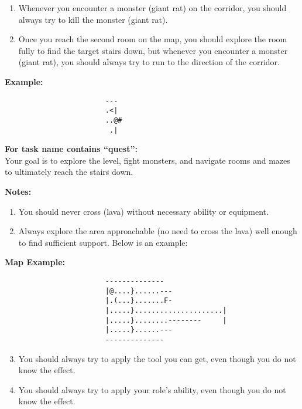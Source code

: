 \begin{MyGreenBox}
\begin{enumerate}
		\item Whenever you encounter a monster (giant rat) on the corridor, you
			should always try to kill the monster (giant rat).

		\item Once you reach the second room on the map, you should explore the room
			fully to find the target stairs down, but whenever you encounter a monster
			(giant rat), you should always try to run to the direction of the corridor.
	\end{enumerate}

	\textbf{Example:} \begin{verbatim}
                        ---
                        .<|
                        ..@#
                         .|
\end{verbatim}

	\textbf{For task name contains “quest”:}\\ Your goal is to explore the level, fight
	monsters, and navigate rooms and mazes to ultimately reach the stairs down.

	\textbf{Notes:}
	\begin{enumerate}
		\item You should never cross (lava) without necessary ability or equipment.

		\item Always explore the area approachable (no need to cross the lava) well enough
			to find sufficient support. Below is an example:
	\end{enumerate}

	\textbf{Map Example:} \begin{verbatim}
                        --------------
                        |@....}......---
                        |.(...}.......F-
                        |.....}.....................|
                        |.....}........--------     |
                        |.....}......---
                        --------------
\end{verbatim}

	\begin{enumerate}
		\setcounter{enumi}{2}

		\item You should always try to apply the tool you can get, even though you
			do not know the effect.

		\item You should always try to apply your role's ability, even though you do
			not know the effect.
	\end{enumerate}


\end{MyGreenBox}
